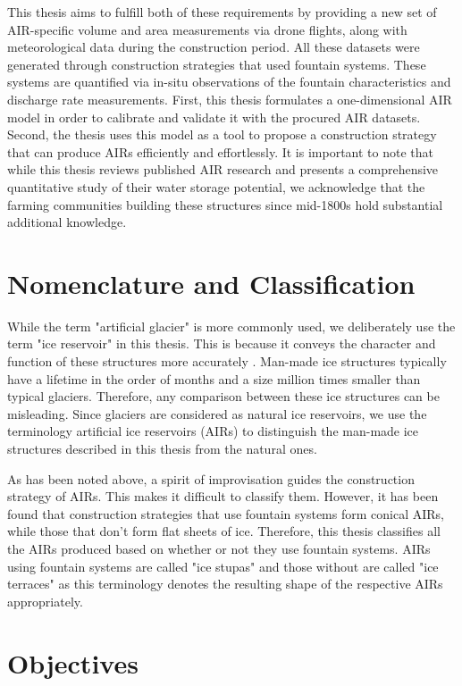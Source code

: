 This thesis aims to fulfill both of these requirements by providing a new set of AIR-specific volume and area
measurements via drone flights, along with meteorological data during the construction period. All these
datasets were generated through construction strategies that used fountain systems. These systems are quantified via in-situ
observations of the fountain characteristics and discharge rate measurements. First, this thesis
formulates a one-dimensional AIR model in order to calibrate and validate it with the procured AIR datasets.
Second, the thesis uses this model as a tool to propose a construction strategy that can produce AIRs
efficiently and effortlessly. It is important to note that while this thesis reviews published AIR research and
presents a comprehensive quantitative study of their water storage potential, we acknowledge that the farming
communities building these structures since mid-1800s hold substantial additional knowledge.


\section{Nomenclature and Classification}

While the term "artificial glacier" is more commonly used, we deliberately use the term "ice reservoir" in this
thesis. This is because it conveys the character and function of these structures more accurately
\citep{nusserSociohydrologyArtificialGlaciers2019}. Man-made ice structures typically have a lifetime in the
order of months and a size million times smaller than typical glaciers. Therefore, any comparison between these
ice structures can be misleading. Since glaciers are considered as natural ice reservoirs, we use the
terminology artificial ice reservoirs (AIRs) to distinguish the man-made ice structures described in this thesis
from the natural ones. 

As has been noted above, a spirit of improvisation guides the construction strategy of AIRs. This makes it
difficult to classify them. However, it has been found that construction strategies that use fountain systems
form conical AIRs, while those that don't form flat sheets of ice. Therefore, this thesis classifies all the
AIRs produced based on whether or not they use fountain systems. AIRs using fountain systems are called "ice
stupas" and those without are called "ice terraces" as this terminology denotes the resulting shape of the
respective AIRs appropriately.

\section{Objectives}

